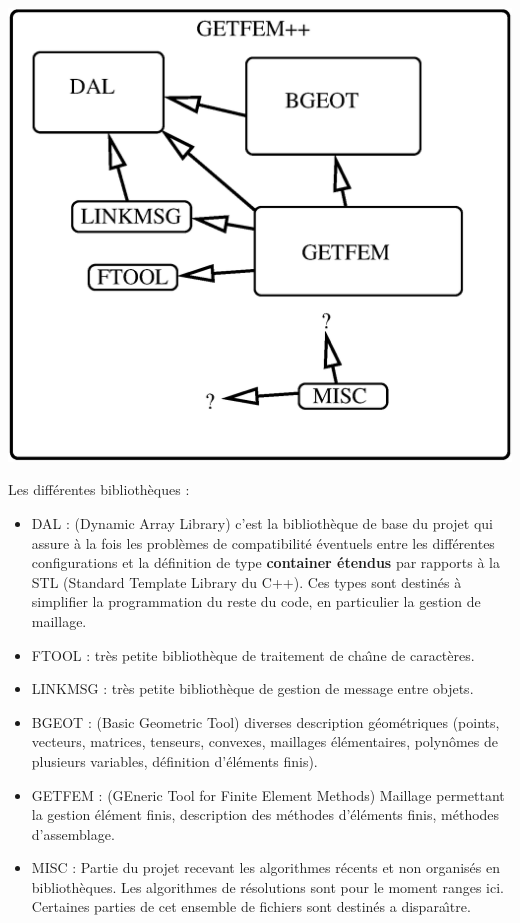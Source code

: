 \documentclass[12pt,a4paper]{../doc}
\begin{document}
{\begin{center}
\includegraphics[width=17cm,angle=0]{getfem_orga.eps}
\end{center}

Les diff\'erentes biblioth\`eques :
\begin{itemize}
  \item DAL : (Dynamic Array Library) c'est la biblioth\`eque de base du projet qui assure \`a la fois
    les probl\`emes de compatibilit\'e \'eventuels entre les diff\'erentes configurations et la d\'efinition de type {\bf container \'etendus} par rapports \`a la STL (Standard Template Library du C++). Ces types sont destin\'es \`a simplifier la programmation du reste du code, en particulier la gestion de maillage.\\[0.2cm]
  \item FTOOL : tr\`es petite biblioth\`eque de traitement de cha\^\i ne de caract\`eres.\\[0.2cm]
  \item LINKMSG : tr\`es petite biblioth\`eque de gestion de message entre objets.\\[0.2cm]
  \item BGEOT : (Basic Geometric Tool) diverses description g\'eom\'etriques (points, vecteurs, matrices, tenseurs, convexes, maillages \'el\'ementaires, polyn\^omes de plusieurs variables, d\'efinition d'\'el\'ements finis).\\[0.2cm]
  \item GETFEM : (GEneric Tool for Finite Element Methods) Maillage permettant la gestion \'el\'ement finis, description des m\'ethodes d'\'el\'ements finis, m\'ethodes d'assemblage. \\[0.2cm]
  \item MISC : Partie du projet recevant les algorithmes r\'ecents et non organis\'es en biblioth\`eques. Les algorithmes de r\'esolutions sont pour le moment ranges ici. Certaines parties de cet ensemble de fichiers sont destin\'es a dispara\^\i tre. \\[0.2cm]
\end{itemize}

}
\end{document}
